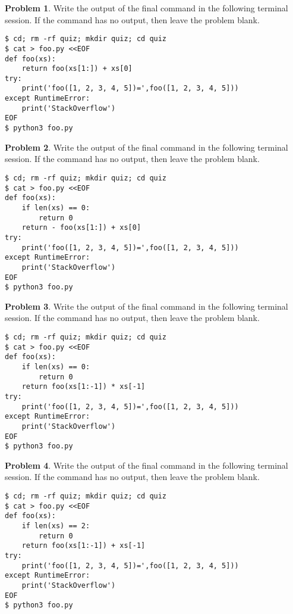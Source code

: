 \documentclass[10pt]{article}
\theoremstyle{definition}
\newtheorem{problem}{Problem}
\begin{document}
\filbreak
\begin{problem}
    Write the output of the final command in the following terminal session.
    If the command has no output, then leave the problem blank.
\end{problem}
\begin{lstlisting}
$ cd; rm -rf quiz; mkdir quiz; cd quiz
$ cat > foo.py <<EOF
def foo(xs):
    return foo(xs[1:]) + xs[0]
try:
    print('foo([1, 2, 3, 4, 5])=',foo([1, 2, 3, 4, 5]))
except RuntimeError:
    print('StackOverflow')
EOF
$ python3 foo.py
\end{lstlisting}


\filbreak
\begin{problem}
    Write the output of the final command in the following terminal session.
    If the command has no output, then leave the problem blank.
\end{problem}
\begin{lstlisting}
$ cd; rm -rf quiz; mkdir quiz; cd quiz
$ cat > foo.py <<EOF
def foo(xs):
    if len(xs) == 0:
        return 0
    return - foo(xs[1:]) + xs[0]
try:
    print('foo([1, 2, 3, 4, 5])=',foo([1, 2, 3, 4, 5]))
except RuntimeError:
    print('StackOverflow')
EOF
$ python3 foo.py
\end{lstlisting}


\filbreak
\begin{problem}
    Write the output of the final command in the following terminal session.
    If the command has no output, then leave the problem blank.
\end{problem}
\begin{lstlisting}
$ cd; rm -rf quiz; mkdir quiz; cd quiz
$ cat > foo.py <<EOF
def foo(xs):
    if len(xs) == 0:
        return 0
    return foo(xs[1:-1]) * xs[-1]
try:
    print('foo([1, 2, 3, 4, 5])=',foo([1, 2, 3, 4, 5]))
except RuntimeError:
    print('StackOverflow')
EOF
$ python3 foo.py
\end{lstlisting}

\filbreak
\begin{problem}
    Write the output of the final command in the following terminal session.
    If the command has no output, then leave the problem blank.
\end{problem}
\begin{lstlisting}
$ cd; rm -rf quiz; mkdir quiz; cd quiz
$ cat > foo.py <<EOF
def foo(xs):
    if len(xs) == 2:
        return 0
    return foo(xs[1:-1]) + xs[-1]
try:
    print('foo([1, 2, 3, 4, 5])=',foo([1, 2, 3, 4, 5]))
except RuntimeError:
    print('StackOverflow')
EOF
$ python3 foo.py
\end{lstlisting}
\end{document}
